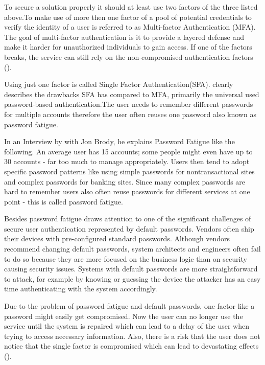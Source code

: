 To secure a solution properly it should at least use two factors of the three listed above.To make use of more then one factor of a pool of potential credentials to verify the identity of a user is referred to as Multi-factor Authentication (MFA). The goal of multi-factor authentication is it to provide a layered defense and make it harder for unauthorized individuals to gain access. If one of the factors breaks, the service can still rely on the non-compromised authentication factors (\citet{Dasgupta:2017:AUA}).

Using just one factor is called Single Factor Authentication(SFA). \cite{Dasgupta:2017:AUA} clearly describes the drawbacks SFA has compared to MFA, primarily the universal used password-based authentication.The user needs to remember different passwords for multiple accounts therefore the user often reuses one password also known as password fatigue.

In an Interview by \cite{Tomkins:2009:DPF} with Jon Brody, he explains Password Fatigue like the following. An average user has 15 accounts; some people might even have up to 30 accounts - far too much to manage appropriately. Users then tend to adopt specific password patterns like using simple passwords for nontransactional sites and complex passwords for banking sites. Since many complex passwords are hard to remember users also often reuse passwords for different services at one point - this is called password fatigue. 

Besides password fatigue \cite{Todorov:2007:MUI} draws attention to one of the significant challenges of secure user authentication represented by default passwords. Vendors often ship their devices with pre-configured standard passwords. Although vendors recommend changing default passwords, system architects and engineers often fail to do so because they are more focused on the business logic than on security causing security issues. Systems with default passwords are more straightforward to attack, for example by knowing or guessing the device the attacker has an easy time authenticating with the system accordingly. 


 Due to the problem of password fatigue and default passwords, one factor like a password might easily get compromised. Now the user can no longer use the service until the system is repaired which can lead to a delay of the user when trying to access necessary information. Also, there is a risk that the user does not notice that the single factor is compromised which can lead to devastating effects (\cite{Dasgupta:2017:AUA}). 

